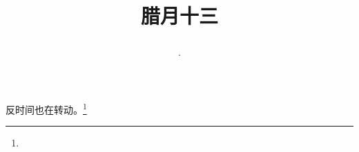 \title{\date[d=23,m=1,y=2024][year:cn-y,年,month:cn,day:cn,日,·,weekday]·腊月十三 }
反时间也在转动。\footnote{ }

